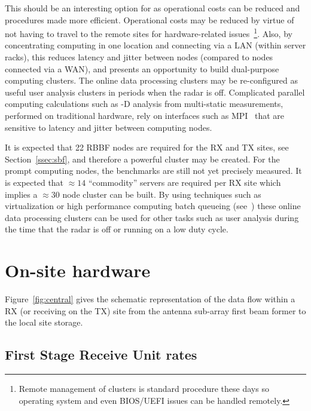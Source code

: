 \documentclass[12pt,a4paper]{article}
\begin{document}
This should be an interesting option for \ED as operational costs can be reduced and procedures made more efficient.
Operational costs may be reduced by virtue of not having to travel to the remote sites for hardware-related issues~\footnote{Remote management of clusters is standard procedure these days so operating system and even BIOS/UEFI issues can be handled remotely.}. 
Also, by concentrating computing \einfra in one location and connecting via a LAN (within server racks), this reduces latency and jitter between nodes (compared to nodes connected via a WAN), and presents an opportunity to build dual-purpose computing clusters.
The online data processing clusters may be re-configured as useful user analysis clusters in periods when the radar is off.
Complicated parallel computing calculations such as -D analysis from multi-static measurements, performed on traditional hardware, rely on interfaces such as MPI~\cite{mpi} that are sensitive to latency and jitter between computing nodes.

It is expected that 22 RBBF nodes are required for the RX and TX sites, see Section~\ref{ssec:sbf}, and therefore a powerful cluster may be created.
For the prompt computing nodes, the benchmarks are still not yet precisely measured.
It is expected that $\approx 14$ ``commodity'' servers are required per RX site which implies a $\approx 30$ node cluster can be built.
By using techniques such as virtualization or high performance computing batch queueing (see~\cite{e3dds-do3}) these online data processing clusters can be used for other tasks such as user analysis during the time that the radar is off or running on a low duty cycle.

\section{On-site hardware} \label{sec-onsite-hw}


Figure~\ref{fig:central} gives the schematic representation of the data flow within a RX (or receiving on the TX) site from the antenna sub-array first beam former to the local site storage.

\subsection{First Stage Receive Unit rates}
\label{ssec:bfrates}
\end{document}
